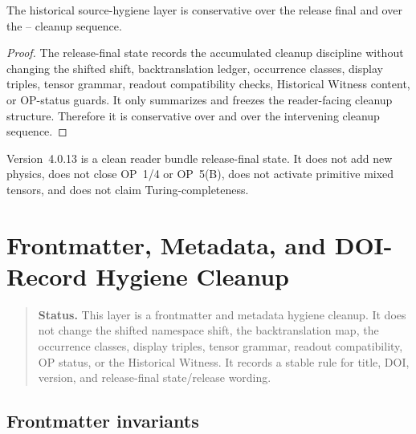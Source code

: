 \begin{theorem}
\label{thm:v406-clean-reader-bundle-conservativity}
The  historical source-hygiene layer is conservative over the  release
final and over the -- cleanup sequence.
\end{theorem}

\begin{proof}
The release-final state records the accumulated cleanup discipline without changing the
shifted shift, backtranslation ledger, occurrence classes, display triples, tensor
grammar, readout compatibility checks, Historical Witness content, or OP-status
guards. It only summarizes and freezes the reader-facing cleanup structure.
Therefore it is conservative over  and over the intervening cleanup
sequence.
\end{proof}

\begin{remark}
\label{rem:v406-non-claim}
Version~4.0.13 is a clean reader bundle release-final state. It does not add new physics,
does not close OP~1/4 or OP~5(B), does not activate primitive mixed tensors,
and does not claim Turing-completeness.
\end{remark}



\clearpage
\section{ Frontmatter, Metadata, and DOI-Record Hygiene Cleanup}
\label{sec:v407-frontmatter-metadata-doi-record-hygiene-cleanup}

\begin{quote}\small
\noindent\textbf{Status.}
This  layer is a frontmatter and metadata hygiene cleanup. It does not
change the shifted namespace shift, the backtranslation map, the occurrence classes,
display triples, tensor grammar, readout compatibility, OP status, or the
Historical Witness. It records a stable rule for title, DOI, version, and
release-final state/release wording.
\end{quote}

\subsection{Frontmatter invariants}
\label{subsec:v407-frontmatter-invariants}

